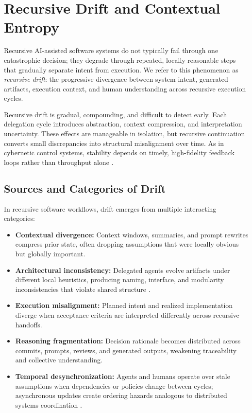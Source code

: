 \section{Recursive Drift and Contextual Entropy}
\label{sec:recursive-drift}

Recursive AI-assisted software systems do not typically fail through one catastrophic decision; they degrade through repeated, locally reasonable steps that gradually separate intent from execution. We refer to this phenomenon as \textit{recursive drift}: the progressive divergence between system intent, generated artifacts, execution context, and human understanding across recursive execution cycles.

Recursive drift is gradual, compounding, and difficult to detect early. Each delegation cycle introduces abstraction, context compression, and interpretation uncertainty. These effects are manageable in isolation, but recursive continuation converts small discrepancies into structural misalignment over time. As in cybernetic control systems, stability depends on timely, high-fidelity feedback loops rather than throughput alone \cite{Wiener1948Cybernetics,Beer1972BrainFirm}.

\subsection{Sources and Categories of Drift}

In recursive software workflows, drift emerges from multiple interacting categories:
\begin{itemize}
  \item \textbf{Contextual divergence:} Context windows, summaries, and prompt rewrites compress prior state, often dropping assumptions that were locally obvious but globally important.
  \item \textbf{Architectural inconsistency:} Delegated agents evolve artifacts under different local heuristics, producing naming, interface, and modularity inconsistencies that violate shared structure \cite{Parnas1972Modularization}.
  \item \textbf{Execution misalignment:} Planned intent and realized implementation diverge when acceptance criteria are interpreted differently across recursive handoffs.
  \item \textbf{Reasoning fragmentation:} Decision rationale becomes distributed across commits, prompts, reviews, and generated outputs, weakening traceability and collective understanding.
  \item \textbf{Temporal desynchronization:} Agents and humans operate over stale assumptions when dependencies or policies change between cycles; asynchronous updates create ordering hazards analogous to distributed systems coordination \cite{Lamport1978TimeClocks,Vogels2009EventuallyConsistent}.
\end{itemize}

